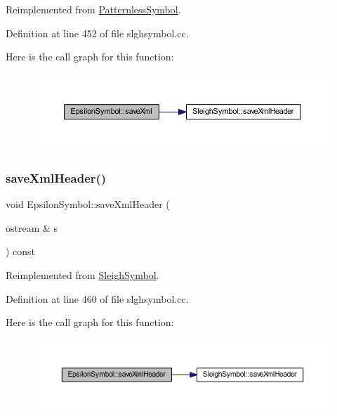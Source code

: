 Reimplemented from \mbox{\hyperlink{class_patternless_symbol_a4afb029a1e6456ffa90468cb29587529}{Patternless\+Symbol}}.



Definition at line 452 of file slghsymbol.\+cc.

Here is the call graph for this function\+:
\nopagebreak
\begin{figure}[H]
\begin{center}
\leavevmode
\includegraphics[width=350pt]{class_epsilon_symbol_a825d93a75ea8a0d3c3448ce5abef3f27_cgraph}
\end{center}
\end{figure}
\mbox{\label{class_epsilon_symbol_ace04d6ded42db2e187f83e90090d9718}} 
\subsubsection{\texorpdfstring{saveXmlHeader()}{saveXmlHeader()}}
{\footnotesize\ttfamily void Epsilon\+Symbol\+::save\+Xml\+Header (\begin{DoxyParamCaption}\item[{ostream \&}]{s }\end{DoxyParamCaption}) const\hspace{0.3cm}{\ttfamily [virtual]}}



Reimplemented from \mbox{\hyperlink{class_sleigh_symbol_ac501be7c584bc0568c29fb95910962e9}{Sleigh\+Symbol}}.



Definition at line 460 of file slghsymbol.\+cc.

Here is the call graph for this function\+:
\nopagebreak
\begin{figure}[H]
\begin{center}
\leavevmode
\includegraphics[width=350pt]{class_epsilon_symbol_ace04d6ded42db2e187f83e90090d9718_cgraph}
\end{center}
\end{figure}


